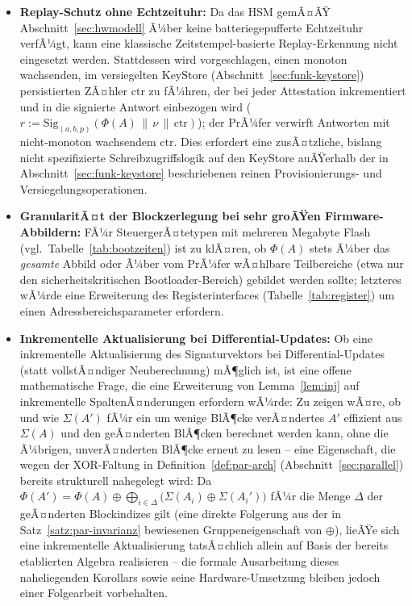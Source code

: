 ﻿\documentclass[a4paper,12pt]{article}
\theoremstyle{definition}
\begin{document}
\begin{itemize}
	\item \textbf{Replay-Schutz ohne Echtzeituhr:} Da das HSM gemÃ¤ÃŸ Abschnitt~\ref{sec:hwmodell} Ã¼ber keine batteriegepufferte Echtzeituhr verfÃ¼gt, kann eine klassische Zeitstempel-basierte Replay-Erkennung nicht eingesetzt werden. Stattdessen wird vorgeschlagen, einen monoton wachsenden, im versiegelten KeyStore (Abschnitt~\ref{sec:funk-keystore}) persistierten ZÃ¤hler $\mathrm{ctr}$ zu fÃ¼hren, der bei jeder Attestation inkrementiert und in die signierte Antwort einbezogen wird ($r := \mathrm{Sig}_{(a,b,p)}(\Phi(A) \,\|\, \nu \,\|\, \mathrm{ctr})$); der PrÃ¼fer verwirft Antworten mit nicht-monoton wachsendem $\mathrm{ctr}$. Dies erfordert eine zusÃ¤tzliche, bislang nicht spezifizierte Schreibzugriffslogik auf den KeyStore auÃŸerhalb der in Abschnitt~\ref{sec:funk-keystore} beschriebenen reinen Provisionierungs- und Versiegelungsoperationen.
	\item \textbf{GranularitÃ¤t der Blockzerlegung bei sehr groÃŸen Firmware-Abbildern:} FÃ¼r SteuergerÃ¤tetypen mit mehreren Megabyte Flash (vgl.\ Tabelle~\ref{tab:bootzeiten}) ist zu klÃ¤ren, ob $\Phi(A)$ stets Ã¼ber das \emph{gesamte} Abbild oder Ã¼ber vom PrÃ¼fer wÃ¤hlbare Teilbereiche (etwa nur den sicherheitskritischen Bootloader-Bereich) gebildet werden sollte; letzteres wÃ¼rde eine Erweiterung des Registerinterfaces (Tabelle~\ref{tab:register}) um einen Adressbereichsparameter erfordern.
	\item \textbf{Inkrementelle Aktualisierung bei Differential-Updates:} Ob eine inkrementelle Aktualisierung des Signaturvektors bei Differential-Updates (statt vollstÃ¤ndiger Neuberechnung) mÃ¶glich ist, ist eine offene mathematische Frage, die eine Erweiterung von Lemma~\ref{lem:inj} auf inkrementelle SpaltenÃ¤nderungen erfordern wÃ¼rde: Zu zeigen wÃ¤re, ob und wie $\Sigma(A')$ fÃ¼r ein um wenige BlÃ¶cke verÃ¤ndertes $A'$ effizient aus $\Sigma(A)$ und den geÃ¤nderten BlÃ¶cken berechnet werden kann, ohne die Ã¼brigen, unverÃ¤nderten BlÃ¶cke erneut zu lesen -- eine Eigenschaft, die wegen der XOR-Faltung in Definition~\ref{def:par-arch} (Abschnitt~\ref{sec:parallel}) bereits strukturell nahegelegt wird: Da $\Phi(A') = \Phi(A) \oplus \bigoplus_{i \in \Delta} \bigl(\Sigma(A_i) \oplus \Sigma(A_i')\bigr)$ fÃ¼r die Menge $\Delta$ der geÃ¤nderten Blockindizes gilt (eine direkte Folgerung aus der in Satz~\ref{satz:par-invarianz} bewiesenen Gruppeneigenschaft von $\oplus$), lieÃŸe sich eine inkrementelle Aktualisierung tatsÃ¤chlich allein auf Basis der bereits etablierten Algebra realisieren -- die formale Ausarbeitung dieses naheliegenden Korollars sowie seine Hardware-Umsetzung bleiben jedoch einer Folgearbeit vorbehalten.
\end{itemize}
\end{document}

